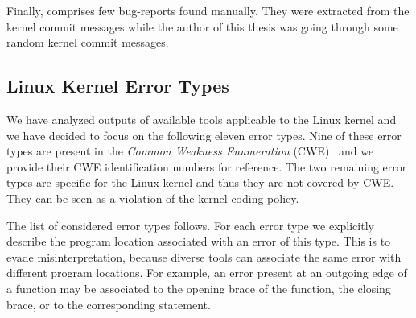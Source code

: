 Finally, \cdb comprises few bug-reports found manually. They were extracted
from the kernel commit messages while the author of this thesis was going
through some random kernel commit messages.

\subsection{Linux Kernel Error Types} \label{sec:cdb_error_type}

We have analyzed outputs of available tools applicable to the Linux kernel
and we have decided to focus on the following eleven error types. Nine of
these error types are present in the \emph{Common Weakness Enumeration}
(CWE)~\cite{cwe} and we provide their CWE identification numbers for
reference. The two remaining error types are specific for the Linux kernel
and thus they are not covered by CWE. They can be seen as a violation of the
kernel coding policy.

The list of considered error types follows. For each error type we
explicitly describe the program location associated with an error of this
type. This is to evade misinterpretation, because diverse tools can associate
the same error with different program locations. For example, an error
present at an outgoing edge of a function may be associated to the opening
brace of the function, the closing brace, or to the corresponding
 statement.

